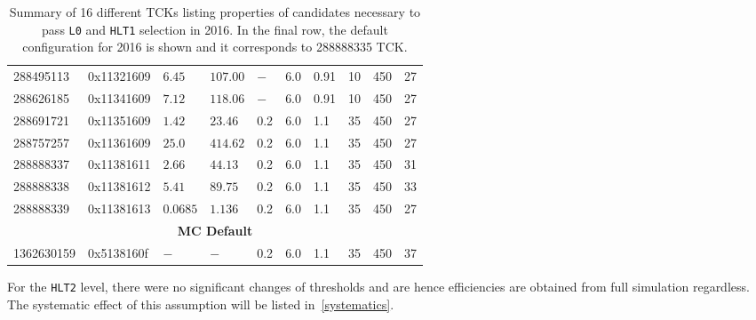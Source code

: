 \begin{table}
\begin{center}
\begin{tabular}{l l l l | l l l l | l l }
      288495113 & 0x11321609 & $6.45$ &  $107.00$   &  $-$ & 6.0 & 0.91 & 10 & 450 & 27 \\%
      288626185 & 0x11341609 & $7.12$ &  $118.06$  &  $-$ & 6.0 & 0.91 & 10 & 450 & 27 \\%
      288691721 & 0x11351609 &  $1.42$ &  $23.46$   &  0.2 & 6.0 & 1.1  & 35  & 450 & 27 \\%
      288757257 & 0x11361609 & $25.0$ &  $414.62$   &  0.2 & 6.0 & 1.1  & 35 & 450 & 27  \\%
      288888337 & 0x11381611 & $ 2.66$ &  $44.13$  &  0.2 & 6.0 & 1.1  & 35  & 450 & 31 \\%
      288888338 & 0x11381612 & $5.41$ &  $89.75$  &  0.2 & 6.0 & 1.1  & 35  & 450 & 33 \\%
      288888339 & 0x11381613 & $0.0685$ &  $1.136$  &  0.2 & 6.0 & 1.1  & 35  & 450 & 27 \\%
      \multicolumn{10}{c}{\textbf{MC Default}} \\
      1362630159 & 0x5138160f & $-$  & $-$   & 0.2 & 6.0 & 1.1  & 35 & 450 & 37\\%

   \end{tabular}
\caption{Summary of 16 different TCKs listing properties of candidates necessary to pass \texttt{L0} and \texttt{HLT1} selection in 2016. In the final row, the default configuration for 2016 is shown and it corresponds to 288888335 TCK.}
\label{tab:2016MC}
	\end{center}
\end{table}

For the \texttt{HLT2} level, there were no significant changes of thresholds and are hence efficiencies are obtained from full simulation regardless. The systematic effect of this assumption will be listed in~\autoref{systematics}.






